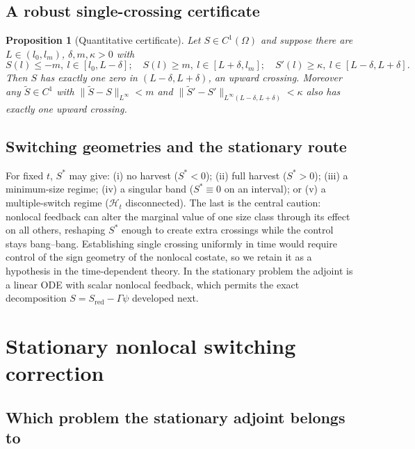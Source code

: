 \documentclass[pdflatex,sn-mathphys-num]{sn-jnl}
\newcommand{\Om}{\Omega}
\theoremstyle{plain}
\newtheorem{proposition}[theorem]{Proposition}
\theoremstyle{definition}
\theoremstyle{remark}
\begin{document}
\subsection{A robust single-crossing certificate}
\label{subsec:robust_single_crossing}

\begin{proposition}[Quantitative certificate]
\label{prop:quantitative_single_crossing}
Let $S\in C^1(\Om)$ and suppose there are $L\in(l_0,l_m)$, $\delta,m,\kappa>0$ with
\[
S(l)\le-m,\ l\in[l_0,L-\delta];\quad
S(l)\ge m,\ l\in[L+\delta,l_m];\quad
S'(l)\ge\kappa,\ l\in[L-\delta,L+\delta].
\]
Then $S$ has exactly one zero in $(L-\delta,L+\delta)$, an upward crossing.
Moreover any $\widetilde S\in C^1$ with
$\|\widetilde S-S\|_{L^\infty}<m$ and
$\|\widetilde S'-S'\|_{L^\infty(L-\delta,L+\delta)}<\kappa$ also has exactly one
upward crossing.
\end{proposition}

\subsection{Switching geometries and the stationary route}
\label{subsec:switching_geometries}

For fixed $t$, $S^*$ may give: (i) no harvest ($S^*<0$); (ii) full harvest
($S^*>0$); (iii) a minimum-size regime; (iv) a singular band ($S^*\equiv0$ on an
interval); or (v) a multiple-switch regime ($\mathcal H_t$ disconnected). The last
is the central caution: nonlocal feedback can alter the marginal value of one size
class through its effect on all others, reshaping $S^*$ enough to create extra
crossings while the control stays bang--bang. Establishing single crossing
uniformly in time would require control of the sign geometry of the nonlocal
costate, so we retain it as a hypothesis in the time-dependent theory. In the
stationary problem the adjoint is a linear ODE with scalar nonlocal feedback,
which permits the exact decomposition $S=S_{\mathrm{red}}-\Gamma\psi$ developed
next.

\section{Stationary nonlocal switching correction}
\label{sec:stationary_switching}

\subsection{Which problem the stationary adjoint belongs to}
\label{subsec:stationary_problem_statement}
\end{document}
